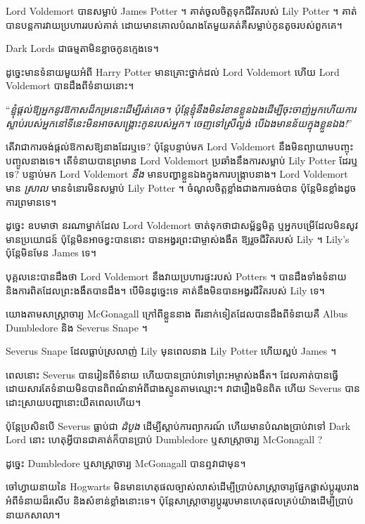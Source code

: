 {Lord Voldemort បានសម្លាប់ James Potter ។ គាត់ចូលចិត្តទុកជីវិតរបស់ Lily Potter ។ គាត់បានបន្តការវាយប្រហាររបស់គាត់ ដោយមានគោលបំណងតែមួយគត់គឺសម្លាប់កូនតូចរបស់ពួកគេ។

Dark Lords ជាធម្មតាមិនខ្លាចកូនក្មេងទេ។

ដូច្នេះមានទំនាយមួយអំពី Harry Potter មានគ្រោះថ្នាក់ដល់ Lord Voldemort ហើយ Lord Voldemort បានដឹងពីទំនាយនោះ។

“\emph{ខ្ញុំផ្តល់ឱ្យអ្នកនូវឱកាសដ៏កម្រនេះដើម្បីរត់គេច។ ប៉ុន្តែ​ខ្ញុំ​នឹង​មិន​រំខាន​ខ្លួន​ឯង​ដើម្បី​ចុះ​ចាញ់​អ្នក​ហើយ​ការ​ស្លាប់​របស់​អ្នក​នៅ​ទីនេះ​មិន​អាច​សង្គ្រោះ​កូន​របស់​អ្នក​។ ចេញ​ទៅ​ស្រី​ល្ងង់ បើ​ឯង​មាន​ន័យ​ក្នុង​ខ្លួន​ឯង!}”

តើវាជាការចង់ផ្តល់ឱកាសឱ្យនាងដែរឬទេ? ប៉ុន្តែបន្ទាប់មក Lord Voldemort នឹងមិនព្យាយាមបញ្ចុះបញ្ចូលនាងទេ។ តើទំនាយបានព្រមាន Lord Voldemort ប្រឆាំងនឹងការសម្លាប់ Lily Potter ដែរឬទេ? បន្ទាប់មក Lord Voldemort \emph{នឹង} មានបញ្ហាខ្លួនឯងក្នុងការបង្ក្រាបនាង។ Lord Voldemort មាន \emph{ ស្រាល } មានទំនោរមិនសម្លាប់ Lily Potter ។ ចំណូល​ចិត្ត​ខ្លាំង​ជាង​ការ​ចង់​បាន ប៉ុន្តែ​មិន​ខ្លាំង​ដូច​ការ​ព្រមាន​ទេ។

ដូច្នេះ ឧបមាថា នរណាម្នាក់ដែល Lord Voldemort ចាត់ទុកថាជាសម្ព័ន្ធមិត្ត ឬអ្នកបម្រើដែលមិនសូវមានប្រយោជន៍ ប៉ុន្តែមិនអាចខ្វះបាននោះ បានអង្វរព្រះជាម្ចាស់ងងឹត ឱ្យរួចជីវិតរបស់ Lily ។ Lily's ប៉ុន្តែមិនមែន James ទេ។

បុគ្គលនេះបានដឹងថា Lord Voldemort នឹងវាយប្រហារផ្ទះរបស់ Potters ។ បាន​ដឹង​ទាំង​ទំនាយ និង​ការ​ពិត​ដែល​ព្រះ​ងងឹត​បាន​ដឹង។ បើ​មិន​ដូច្នេះ​ទេ គាត់​នឹង​មិន​បាន​អង្វរ​ជីវិត​របស់ Lily ទេ។

យោងតាមសាស្រ្តាចារ្យ McGonagall ក្រៅពីខ្លួននាង ពីរនាក់ទៀតដែលបានដឹងពីទំនាយគឺ Albus Dumbledore និង Severus Snape ។

Severus Snape ដែលធ្លាប់ស្រលាញ់ Lily មុនពេលនាង Lily Potter ហើយស្អប់ James ។

ពេល​នោះ Severus បាន​រៀន​ពី​ទំនាយ ហើយ​បាន​ប្រាប់​វា​ទៅ​ព្រះអម្ចាស់​ងងឹត។ ដែលគាត់បានធ្វើដោយសារតែទំនាយមិនបានពិពណ៌នាអំពីជាងស្មូនតាមឈ្មោះ។ វា​ជា​រឿង​មិន​ពិត ហើយ Severus បាន​ដោះស្រាយ​បញ្ហា​នោះ​យឺត​ពេល​ហើយ។

ប៉ុន្តែប្រសិនបើ Severus ធ្លាប់ជា \emph{ដំបូង} ដើម្បីស្តាប់ការព្យាករណ៍ ហើយមានបំណងប្រាប់វាទៅ Dark Lord នោះ ហេតុអ្វីបានជាគាត់ក៏បានប្រាប់ Dumbledore ឬសាស្រ្តាចារ្យ McGonagall ?

ដូច្នេះ Dumbledore ឬសាស្រ្តាចារ្យ McGonagall បានឮវាជាមុន។

ចៅហ្វាយនាយនៃ Hogwarts មិនមានហេតុផលច្បាស់លាស់ដើម្បីប្រាប់សាស្រ្តាចារ្យផ្នែកផ្លាស់ប្តូររូបរាងអំពីទំនាយដ៏រសើប និងសំខាន់ខ្លាំងនោះទេ។ ប៉ុន្តែ​សាស្ត្រាចារ្យ​ប្តូរ​រូប​មាន​ហេតុផល​គ្រប់​យ៉ាង​ដើម្បី​ប្រាប់​នាយក​សាលា។

}
